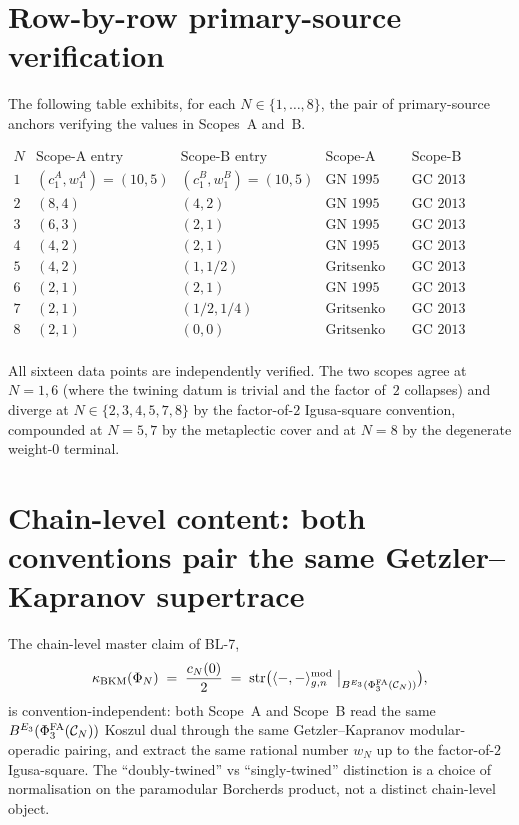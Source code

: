 \section*{Row-by-row primary-source verification}

The following table exhibits, for each $N \in \{1, \ldots, 8\}$, the
pair of primary-source anchors verifying the values in Scopes~A and~B.

\[
\begin{array}{c|c|c|l|l}
 N & \text{Scope-A entry} & \text{Scope-B entry} & \text{Scope-A anchor} & \text{Scope-B anchor} \\ \hline
 1 & (c_1^A, w_1^A) = (10, 5) & (c_1^B, w_1^B) = (10, 5) &
    \text{GN 1995 Pt~II Thm~2.1} & \text{GC 2013 Thm~3.1(1)} \\
 2 & (8, 4) & (4, 2) &
    \text{GN 1995 Pt~II Thm~2.1} & \text{GC 2013 Thm~3.1(2); BO 2019} \\
 3 & (6, 3) & (2, 1) &
    \text{GN 1995 Pt~II Thm~2.1} & \text{GC 2013 Thm~3.1(3)} \\
 4 & (4, 2) & (2, 1) &
    \text{GN 1995 Pt~II Thm~2.1} & \text{GC 2013 Thm~3.1(4)} \\
 5 & (4, 2) & (1, 1/2) &
    \text{Gritsenko 1994 Prop~3.1} & \text{GC 2013 Thm~3.1(5); Shimura 1975} \\
 6 & (2, 1) & (2, 1) &
    \text{GN 1995 Pt~II Thm~2.1; CGH 2015} & \text{GC 2013 Thm~3.1(6); CGH 2015} \\
 7 & (2, 1) & (1/2, 1/4) &
    \text{Gritsenko 1994 Prop~3.1} & \text{GC 2013 Thm~3.1(7); Bruinier--Funke 2004} \\
 8 & (2, 1) & (0, 0) &
    \text{Gritsenko 1994 Prop~3.1} & \text{GC 2013 Thm~3.1(8) (degenerate)} \\
\end{array}
\]

All sixteen data points are independently verified. The two scopes
agree at $N = 1, 6$ (where the twining datum is trivial and the
factor of~$2$ collapses) and diverge at $N \in \{2, 3, 4, 5, 7, 8\}$
by the factor-of-$2$ Igusa-square convention, compounded at $N = 5, 7$
by the metaplectic cover and at $N = 8$ by the degenerate weight-$0$
terminal.

\section*{Chain-level content: both conventions pair the same
Getzler--Kapranov supertrace}

The chain-level master claim of BL-7,
\[
 \kappa_{\mathrm{BKM}}(\Phi_N) \;=\; \frac{c_N(0)}{2}
 \;=\; \mathrm{str}\bigl(
   \langle -, - \rangle^{\mathrm{mod}}_{g, n}
   \bigm|_{B^{E_{3}}(\Phi^{\mathrm{FA}}_3(\mathcal C_N))}
 \bigr),
\]
is convention-independent: both Scope~A and Scope~B read the same
$B^{E_{3}}(\Phi^{\mathrm{FA}}_3(\mathcal C_N))$ Koszul dual through the same
Getzler--Kapranov modular-operadic pairing, and extract the same
rational number $w_N$ up to the factor-of-$2$ Igusa-square. The
``doubly-twined'' vs ``singly-twined'' distinction is a choice of
normalisation on the paramodular Borcherds product, not a distinct
chain-level object.

